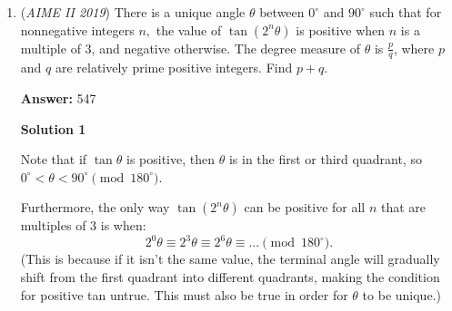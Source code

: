 \begin{enumerate}
 $(3 + a)(2 + b)x = 20$

 We will do casework noting $3 + a$ must be a divisor of $20$ that is at least $3$ since $a$ is nonnegative. Then we get

 $3 + a = 4, 5, 10, 20 \implies a = 1, 2, 7, 17$. We note $a = 17$ is clearly too big as the final number will be a multiple of $2^{19}$ which is clearly way too big. 

 $a = 7$ implies $(2 + b)x = 2 \implies b = 0, x = 1$ as the only solution that works if $x, b$ are nonnegative. But this doesn't work since this case assumes $k$ has both $2$ and $5$ in its prime factorization and if $b = 0$ then $k$ has no factors of $5$ a contradiction.

 $a = 2$ implies $(2 + b)x = 4 \implies x = 1, b = 2$ or $x = 2, b = 0$. As we know, $x = 2, b = 0$ can't work since $b = 0$ doesn't work. So $a = 2$ and $b = 2$ and $x = 1$ implies the number has to be $2^4 \cdot 5^3$. 

 $a = 1$ implies $(2 + b)x = 5 \implies x = 1, b = 3$. This gives $2^3 \cdot 5^4 = 5000$ which is too big.

 So for case 4, we only get one case and that is $2^4 \cdot 5^3 = 2000$.

 Dividing this by $20$ gives $100$.

 Finally, the answer is $372 + 100 = \boxed{472}$



	\item (\textit{AIME II 2019}) There is a unique angle $\theta$ between $0^\circ$ and $90^\circ$ such that for nonnegative integers $n,$ the value of $\tan(2^n\theta)$ is positive when $n$ is a multiple of $3$, and negative otherwise. The degree measure of $\theta$ is $\frac{p}{q}$, where $p$ and $q$ are relatively prime positive integers. Find $p+q$.


 
 \textbf{Answer: }547



\textbf{Solution 1}

Note that if $\tan \theta$ is positive, then $\theta$ is in the first or third quadrant, so $0^{\circ} < \theta < 90^{\circ} \pmod{180^{\circ}}$. 

 Furthermore, the only way $\tan{\left(2^{n}\theta\right)}$ can be positive for all $n$ that are multiples of $3$ is when:
 \[2^0\theta \equiv 2^3\theta \equiv 2^6\theta \equiv ... \pmod{180^{\circ}}.\](This is because if it isn't the same value, the terminal angle will gradually shift from the first quadrant into different quadrants, making the condition for positive tan untrue. This must also be true in order for $\theta$ to be unique.) 


\end{enumerate}
